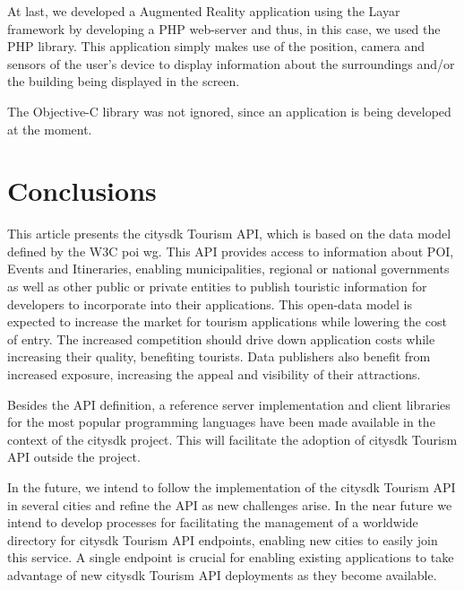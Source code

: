 \documentclass[times]{ettauth}
\begin{document}
At last, we developed a Augmented Reality application using the Layar framework by developing a PHP web-server and thus, in this case, we used the PHP library. 
This application simply makes use of the position, camera and sensors of the user's device to display information about the surroundings and/or the building being displayed in the screen.

The Objective-C library was not ignored, since an application is being developed at the moment.



\section{Conclusions}
\label{s:conclusions}
This article presents the \ac{citysdk} Tourism API, which is based on the data model defined by the \ac{W3C} \ac{poi} \ac{wg}.
This API provides access to information about \ac{POI}, Events and Itineraries, enabling municipalities, regional or national governments as well as other public or private entities to publish touristic information for developers to incorporate into their applications.
This open-data model is expected to increase the market for tourism applications while lowering the cost of entry.
The increased competition should drive down application costs while increasing their quality, benefiting tourists.
Data publishers also benefit from increased exposure, increasing the appeal and visibility of their attractions.

Besides the API definition, a reference server implementation and client libraries for the most popular programming languages have been made available in the context of the \ac{citysdk} project.
This will facilitate the adoption of \ac{citysdk} Tourism API outside the project.

In the future, we intend to follow the implementation of the \ac{citysdk} Tourism API in several cities and refine the API as new challenges arise.
In the near future we intend to develop processes for facilitating the management of a worldwide directory for \ac{citysdk} Tourism API endpoints, enabling new cities to easily join this service.
A single endpoint is crucial for enabling existing applications to take advantage of new \ac{citysdk} Tourism API deployments as they become available.
\end{document}
